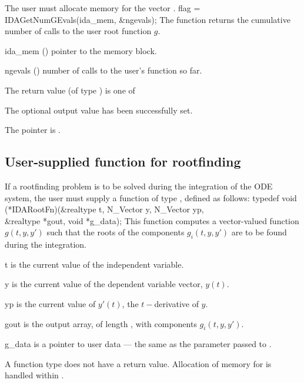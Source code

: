 {
  {\warn} The user must allocate memory for the vector .
}
{
  flag = IDAGetNumGEvals(ida\_mem, \&ngevals);
}
{
  The function  returns the cumulative
  number of calls to the user root function $g$.
}
{
  \begin{args}
  \item[ida\_mem] ()
    pointer to the {\ida} memory block.
  \item[ngevals] ()
    number of calls to the user's function  so far.
  \end{args}
}
{
  The return value  (of type ) is one of
  \begin{args}
  \item[\Id{IDA\_SUCCESS}] 
    The optional output value has been successfully set.
  \item[\Id{IDA\_MEM\_NULL}]
    The  pointer is .
  \end{args}
}
{}

\subsection{User-supplied function for rootfinding}\label{ss:root_us}

If a rootfinding problem is to be solved during the integration of the ODE system,
the user must supply a {\C} function of type , defined as follows:
{
  typedef void (*IDARootFn)(&realtype t, N\_Vector y, N\_Vector yp, \\
                           &realtype *gout, void *g\_data);
}
{
  This function computes a vector-valued function $g(t,y,y')$ such that the
  roots of the  components $g_i(t,y,y')$ are to be found during
  the integration.
}
{
  \begin{args}[g\_data]
  \item[t]
    is the current value of the independent variable.
  \item[y]
    is the current value of the dependent variable vector, $y(t)$.
  \item[yp]
    is the current value of $y'(t)$, the $t-$derivative of $y$.
  \item[gout]
    is the output array, of length , with components $g_i(t,y,y')$.
  \item[g\_data]
    is a pointer to user data --- the same as the       
    parameter passed to .   
  \end{args}
}
{
  A  function type does not have a return value.
}
{
  Allocation of memory for  is handled within {\ida}.
}

